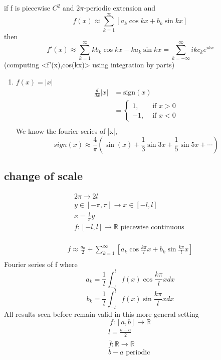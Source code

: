 \begin{theorem}[]{}
if f is piecewise $ C^2 $ and $ 2\pi $-periodic extension and$$
    f(x)\approx \sum_{k=1}^{\infty}[a_k\cos{kx}+b_k\sin{kx}]
$$ then $$
    f'(x)\approx \sum_{k=1}^{\infty}kb_k\cos{kx}-ka_k\sin{kx}=\sum_{k=-\infty}^{\infty}ikc_ke^{ikx}
$$ (computing <f'(x),cos(kx)> using integration by parts)
\end{theorem}
\begin{example}[]{}
 \begin{enumerate}[label=\circled{\arabic*}] 
 \item $ f(x)=|x| $
 \begin{align*}{}{}
 \frac{d}{dx}|x|&=\text{sign}(x)\\
 &=\begin{cases}
    1, & \text{ if } x>0\\
    -1, & \text{ if } x<0
    \end{cases}\\
 \end{align*}
 We know the fourier series of |x|,$$
    sign(x)\approx \frac{4}{\pi}(\sin(x)+\frac{1}{3}\sin{3x}+\frac{1}{5}\sin{5x}+\cdots)
 $$ 
 \end{enumerate}
\end{example}
\subsection{change of scale}
\begin{align*}{}{}
2\pi\rightarrow2l \\
y\in[-\pi,\pi]\rightarrow x\in[-l,l]\\
x=\frac{l}{\pi}y\\
f:[-l,l]\rightarrow\mathbb{R} \text{ piecewise continuous }\\
\end{align*} 
\begin{definition}[]{}
\begin{align*}{}{}
f\approx\frac{a_0}{2}+\sum_{k=1}^{\infty}[a_k\cos{\frac{k\pi}{l}x}+b_k\sin{\frac{k\pi}{l}x}]\\
\end{align*}
Fourier series of f where$$
    a_k=\frac{1}{l}\int_{-l}^{l}f(x)\cos{\frac{k\pi}{l}x}dx$$ $$
    b_k=\frac{1}{l}\int_{-l}^{l}f(x)\sin{\frac{k\pi}{l}x}dx
$$ All results seen before remain valid in this more general setting$$
    f:[a,b]\rightarrow\mathbb{R}
$$ \begin{align*}{}{}
l=\frac{b-a}{2}\\
\bar{f}:\mathbb{R}\rightarrow\mathbb{R}\\
b-a \text{ periodic }
\end{align*}
\end{definition}
